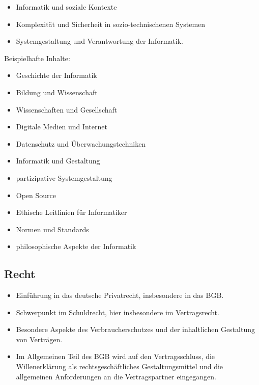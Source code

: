 \begin{itemize}
\tightlist
\item
  Informatik und soziale Kontexte
\item
  Komplexität und Sicherheit in sozio-technischenen Systemen
\item
  Systemgestaltung und Verantwortung der Informatik.
\end{itemize}

Beispielhafte Inhalte:

\begin{itemize}
\tightlist
\item
  Geschichte der Informatik
\item
  Bildung und Wissenschaft
\item
  Wissenschaften und Gesellschaft
\item
  Digitale Medien und Internet
\item
  Datenschutz und Überwachungstechniken
\item
  Informatik und Gestaltung
\item
  partizipative Systemgestaltung
\item
  Open Source
\item
  Ethische Leitlinien für Informatiker
\item
  Normen und Standards
\item
  philosophische Aspekte der Informatik
\end{itemize}

\subsection*{Recht\label{/mi-2017/modulbeschreibungen-bachelor/BA_MUG}}\label{rechtpathlabelmi-2017modulbeschreibungen-bachelorbaux5fmug}

\begin{itemize}
\tightlist
\item
  Einführung in das deutsche Privatrecht, insbesondere in das BGB.
\item
  Schwerpunkt im Schuldrecht, hier insbesondere im Vertragsrecht.
\item
  Besondere Aspekte des Verbraucherschutzes und der inhaltlichen
  Gestaltung von Verträgen.
\item
  Im Allgemeinen Teil des BGB wird auf den Vertragsschluss, die
  Willenerklärung als rechtsgeschäftliches Gestaltungsmittel und die
  allgemeinen Anforderungen an die Vertragspartner eingegangen.
\end{itemize}

